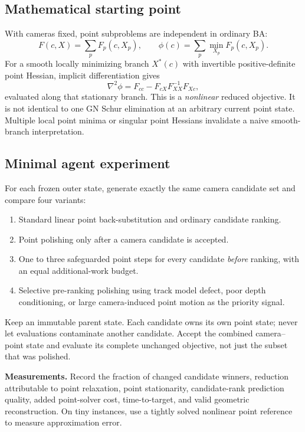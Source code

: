\documentclass[11pt,a4paper]{article}
\begin{document}
\subsection*{Mathematical starting point}
With cameras fixed, point subproblems are independent in ordinary BA:
\begin{equation}
 F(c,X)=\sum_p F_p(c,X_p),\qquad
 \phi(c)=\sum_p\min_{X_p} F_p(c,X_p).
\end{equation}
For a smooth locally minimizing branch $X^*(c)$ with invertible positive-definite point Hessian, implicit differentiation gives
\begin{equation}
 \nabla^2\phi=F_{cc}-F_{cX}F_{XX}^{-1}F_{Xc},
\end{equation}
evaluated along that stationary branch. This is a \emph{nonlinear} reduced objective. It is not identical to one GN Schur elimination at an arbitrary current point state. Multiple local point minima or singular point Hessians invalidate a naive smooth-branch interpretation.

\subsection*{Minimal agent experiment}
For each frozen outer state, generate exactly the same camera candidate set and compare four variants:
\begin{enumerate}
\item Standard linear point back-substitution and ordinary candidate ranking.
\item Point polishing only after a camera candidate is accepted.
\item One to three safeguarded point steps for every candidate \emph{before} ranking, with an equal additional-work budget.
\item Selective pre-ranking polishing using track model defect, poor depth conditioning, or large camera-induced point motion as the priority signal.
\end{enumerate}
Keep an immutable parent state. Each candidate owns its own point state; never let evaluations contaminate another candidate. Accept the combined camera--point state and evaluate its complete unchanged objective, not just the subset that was polished.

\textbf{Measurements.} Record the fraction of changed candidate winners, reduction attributable to point relaxation, point stationarity, candidate-rank prediction quality, added point-solver cost, time-to-target, and valid geometric reconstruction. On tiny instances, use a tightly solved nonlinear point reference to measure approximation error.
\end{document}
